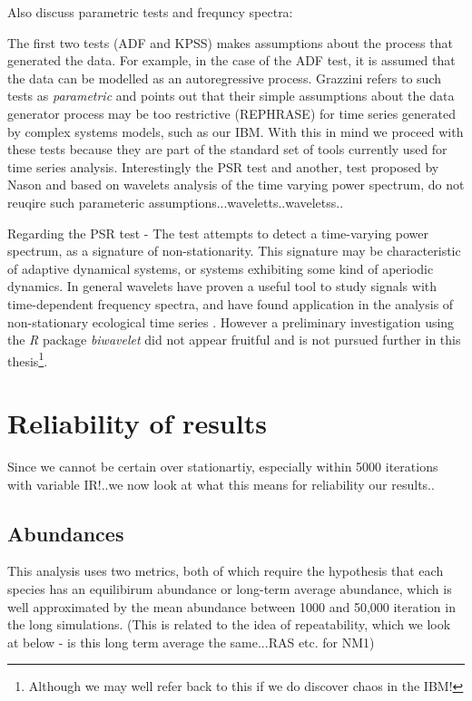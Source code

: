 Also discuss parametric tests and frequncy spectra:

The first two tests (ADF and KPSS) makes assumptions about the process that generated the data. For example, in the case of the ADF test, it is assumed that the data can be modelled as an autoregressive process. Grazzini \cite{grazzini2012analysis} refers to such tests as \emph{parametric} and points out that their simple assumptions about the data generator process may be too restrictive (REPHRASE) for time series generated by complex systems models, such as our IBM.  With this in mind we proceed with these tests because they are part of the standard set of tools currently used for time series analysis. Interestingly the PSR test and another, test proposed by Nason \cite{nason2013test} and based on wavelets analysis of the time varying power spectrum, do not reuqire such parameteric assumptions...waveletts..waveletss..

Regarding the PSR test - The test attempts to detect a time-varying power spectrum, as a signature of non-stationarity. This signature may be characteristic of adaptive dynamical systems, or systems exhibiting some kind of aperiodic dynamics. In general wavelets have proven a useful tool to study signals with time-dependent frequency spectra, and have found application in the analysis of non-stationary ecological time series \cite{cazelles2008wavelet, nason2013test}. However a preliminary investigation using the \emph{R} package \emph{biwavelet} did not appear fruitful and is not pursued further in this thesis\footnote{Although we may well refer back to this if we do discover chaos in the IBM!}. 





\section{Reliability of results}
\label{sec:reliability}

Since we cannot be certain over stationartiy, especially within 5000 iterations with variable IR!..we now look at what this means for reliability our results..

\subsection{Abundances}

This analysis uses two metrics, both of which require the hypothesis that each species has an equilibirum abundance or long-term average abundance, which is well approximated by the mean abundance between 1000 and 50,000 iteration in the long simulations. (This is related to the idea of repeatability, which we look at below - is this long term average the same...RAS etc. for NM1)

